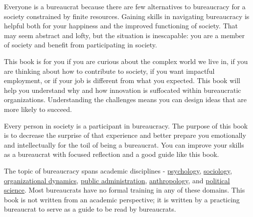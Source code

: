 Everyone is a bureaucrat because there are few alternatives to bureaucracy for a society constrained by finite resources. Gaining skills in navigating bureaucracy is helpful both for your happiness and the improved functioning of society. That may seem abstract and lofty, but the situation is inescapable: you are a member of society and benefit from participating in society. 



This book is for you if you are curious about the complex world we live in,  if you are thinking about how to contribute to society,  if you want impactful employment, or if your job is different from what you expected. This book will help you understand why and how innovation is suffocated within bureaucratic organizations. Understanding the challenges means you can design ideas that are more likely to succeed.


Every person in society is a participant in bureaucracy. The purpose of this book is to decrease the surprise of that experience and better prepare you emotionally and intellectually for the toil of being a bureaucrat. You can improve your skills as a bureaucrat with focused reflection and a good guide like this book. 

The topic of bureaucracy spans academic disciplines - \href{https://en.wikipedia.org/wiki/Psychology}{psychology},
\iftoggle{WPinmargin}{\marginpar{[Wikipedia] psychology}}{}
\href{https://en.wikipedia.org/wiki/Sociology}{sociology},
\href{https://en.wikipedia.org/wiki/Organizational_behavior}{organizational dynamics},
\href{https://en.wikipedia.org/wiki/Public_administration}{public administration}, 
\href{https://en.wikipedia.org/wiki/Anthropology}{anthropology},
and  
\href{https://en.wikipedia.org/wiki/Political_science}{political science}. 
Most bureaucrats have no formal training in any of these domains. This book is not written from an academic perspective; it is written by a practicing bureaucrat to serve as a guide to be read by bureaucrats. 


